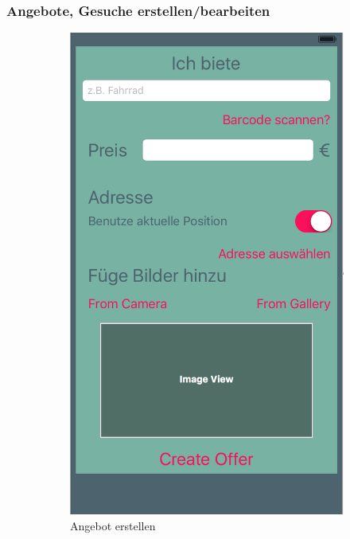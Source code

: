 \subsubsection*{Angebote, Gesuche erstellen/bearbeiten}

\begin{figure}[H]
\begin{subfigure}{0.5\textwidth}
\includegraphics[width=0.9\linewidth]{./Bilder/ioscreateoffer.png} 
\caption{Angebot erstellen}
\label{fig:iosoffer}
\end{subfigure}
\begin{subfigure}{0.5\textwidth}

\end{subfigure}
\end{figure}
